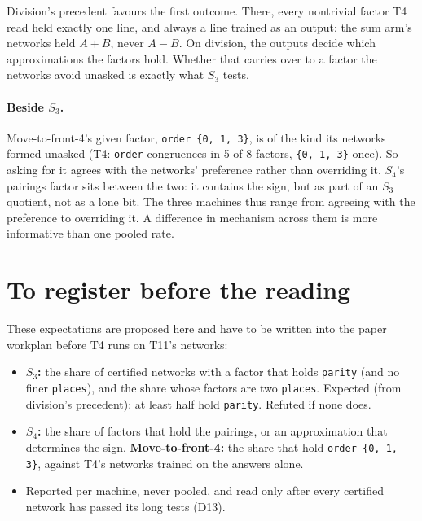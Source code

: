 \documentclass[11pt]{article}
\begin{document}
Division's precedent favours the first outcome. There, every nontrivial factor T4 read held exactly
one line, and always a line trained as an output: the sum arm's networks held $A + B$, never $A - B$.
On division, the outputs decide which approximations the factors hold. Whether that carries over to a
factor the networks avoid unasked is exactly what $S_3$ tests.

\paragraph{Beside \texorpdfstring{$S_3$}{S3}.} Move-to-front-4's given factor, \texttt{order \{0, 1, 3\}}, is of the kind
its networks formed unasked (T4: \texttt{order} congruences in 5 of 8 factors, \texttt{\{0, 1, 3\}}
once). So asking for it agrees with the networks' preference rather than overriding it. $S_4$'s
pairings factor sits between the two: it contains the sign, but as part of an $S_3$ quotient, not as a
lone bit. The three machines thus range from agreeing with the preference to overriding it. A
difference in mechanism across them is more informative than one pooled rate.

\section{To register before the reading}

These expectations are proposed here and have to be written into the paper workplan before T4 runs on
T11's networks:
\begin{itemize}
\item \textbf{$S_3$:} the share of certified networks with a factor that holds \texttt{parity} (and no
  finer \texttt{places}), and the share whose factors are two \texttt{places}. Expected (from
  division's precedent): at least half hold \texttt{parity}. Refuted if none does.
\item \textbf{$S_4$:} the share of factors that hold the pairings, or an approximation that determines
  the sign. \textbf{Move-to-front-4:} the share that hold \texttt{order \{0, 1, 3\}}, against T4's
  networks trained on the answers alone.
\item Reported per machine, never pooled, and read only after every certified network has passed its
  long tests (D13).
\end{itemize}



\end{document}
